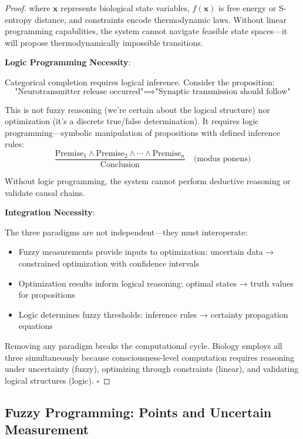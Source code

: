\begin{proof}
where $\mathbf{x}$ represents biological state variables, $f(\mathbf{x})$ is free energy or S-entropy distance, and constraints encode thermodynamic laws. Without linear programming capabilities, the system cannot navigate feasible state spaces—it will propose thermodynamically impossible transitions.

\textbf{Logic Programming Necessity}:

Categorical completion requires logical inference. Consider the proposition:
\begin{equation}
\text{"Neurotransmitter release occurred"} \implies \text{"Synaptic transmission should follow"}
\end{equation}

This is not fuzzy reasoning (we're certain about the logical structure) nor optimization (it's a discrete true/false determination). It requires logic programming—symbolic manipulation of propositions with defined inference rules:
\begin{equation}
\frac{\text{Premise}_1 \wedge \text{Premise}_2 \wedge \cdots \wedge \text{Premise}_n}{\text{Conclusion}} \quad \text{(modus ponens)}
\end{equation}

Without logic programming, the system cannot perform deductive reasoning or validate causal chains.

\textbf{Integration Necessity}:

The three paradigms are not independent—they must interoperate:

\begin{itemize}
\item Fuzzy measurements provide inputs to optimization: uncertain data → constrained optimization with confidence intervals
\item Optimization results inform logical reasoning: optimal states → truth values for propositions
\item Logic determines fuzzy thresholds: inference rules → certainty propagation equations
\end{itemize}

Removing any paradigm breaks the computational cycle. Biology employs all three simultaneously because consciousness-level computation requires reasoning under uncertainty (fuzzy), optimizing through constraints (linear), and validating logical structures (logic). $\square$
\end{proof}

\subsection{Fuzzy Programming: Points and Uncertain Measurement}


